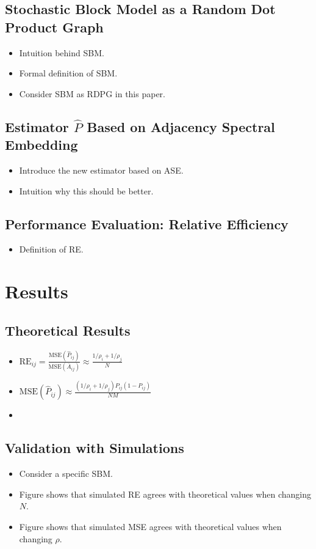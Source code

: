 \documentclass[a4paper]{article}
\begin{document}
\subsection{Stochastic Block Model as a Random Dot Product Graph}
\begin{itemize}
\item Intuition behind SBM.
\item Formal definition of SBM.
\item Consider SBM as RDPG in this paper.
\end{itemize}

\subsection{Estimator $\hat{P}$ Based on Adjacency Spectral Embedding}
\begin{itemize}
\item Introduce the new estimator based on ASE.
\item Intuition why this should be better.
\end{itemize}

\subsection{Performance Evaluation: Relative Efficiency}
\begin{itemize}
\item Definition of RE.
\end{itemize}


\section{Results}

\subsection{Theoretical Results}
\begin{itemize}
\item $\mathrm{RE}_{ij} = \frac{\mathrm{MSE}(\hat{P}_{ij})}{\mathrm{MSE}(\bar{A}_{ij})} \approx \frac{1/\rho_i + 1/\rho_j}{N}$
\item $\mathrm{MSE}(\hat{P}_{ij}) \approx \frac{(1/\rho_i + 1/\rho_j)P_{ij}(1-P_{ij})}{NM}$
\item 
\end{itemize}

\subsection{Validation with Simulations}
\begin{itemize}
\item Consider a specific SBM.
\item Figure shows that simulated RE agrees with theoretical values when changing $N$.
\item Figure shows that simulated MSE agrees with theoretical values when changing $\rho$.
\end{itemize}
\end{document}
